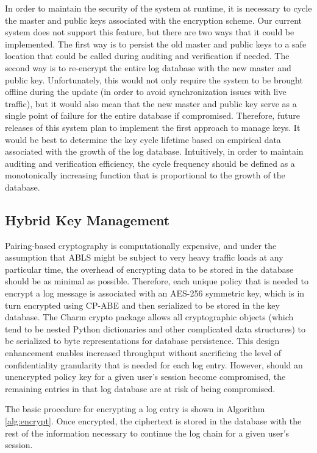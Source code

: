 \documentclass{sig-alternate}
\begin{document}
In order to maintain the security of the system at runtime, it is necessary to cycle the master and public keys
associated with the encryption scheme. Our current system does not support this feature, but there are two
ways that it could be implemented. The first way is to persist the old master and 
public keys to a safe location that could be called during auditing and verification if needed. The second way is 
to re-encrypt the entire log database with the new master and public key. Unfortunately, this would not only require the system to be 
brought offline during the update (in order to avoid synchronization issues with live traffic), but it would also
mean that the new master and public key serve as a single point of failure for the entire database if compromised. 
Therefore, future releases of this system plan to implement the first approach to manage keys. It would be
best to determine the key cycle lifetime based on empirical data associated with the growth of the log database.
Intuitively, in order to maintain auditing and verification efficiency, the cycle frequency should be defined as 
a monotonically increasing function that is proportional to the growth of the database. 

\subsection{Hybrid Key Management}
\label{sec:keyMgmt}

Pairing-based cryptography is computationally expensive, and under the assumption that ABLS might be subject 
to very heavy traffic loads at any particular time, the 
overhead of encrypting data to be stored in the database should be as minimal as possible. Therefore, each unique
policy that is needed to encrypt a log message is associated with an AES-256 symmetric key, which is in 
turn encrypted using CP-ABE and then serialized to be stored in the key database. The Charm crypto package allows all cryptographic 
objects (which tend to be nested Python dictionaries and other complicated data structures) to be serialized to byte 
representations for database persistence. This design enhancement enables 
increased throughput without sacrificing the level of confidentiality granularity that is needed for each log entry. 
However, should an unencrypted policy key for a given user's session become compromised, the remaining entries in 
that log database are at risk of being compromised. 

The basic procedure for encrypting a log entry is shown in Algorithm \ref{alg:encrypt}. Once encrypted, the ciphertext
is stored in the database with the rest of the information necessary to continue the log chain for a given user's session.
  
\end{document}
